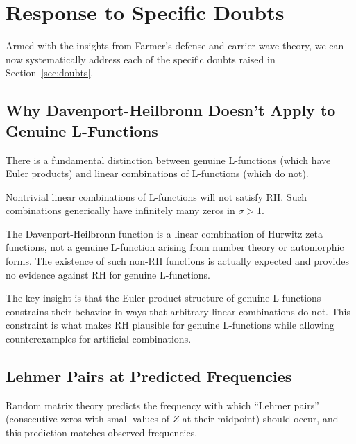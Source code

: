 \section{Response to Specific Doubts}
\label{sec:specific_responses}

Armed with the insights from Farmer's defense and carrier wave theory, we can now systematically address each of the specific doubts raised in Section~\ref{sec:doubts}.

\subsection{Why Davenport-Heilbronn Doesn't Apply to Genuine L-Functions}
\label{subsec:davenport_response}

\begin{theorem}
There is a fundamental distinction between genuine L-functions (which have Euler products) and linear combinations of L-functions (which do not).
\end{theorem}

\begin{principle}
Nontrivial linear combinations of L-functions will not satisfy RH. Such combinations generically have infinitely many zeros in $\sigma > 1$.
\end{principle}

The Davenport-Heilbronn function is a linear combination of Hurwitz zeta functions, not a genuine L-function arising from number theory or automorphic forms. The existence of such non-RH functions is actually expected and provides no evidence against RH for genuine L-functions.

\begin{remark}
The key insight is that the Euler product structure of genuine L-functions constrains their behavior in ways that arbitrary linear combinations do not. This constraint is what makes RH plausible for genuine L-functions while allowing counterexamples for artificial combinations.
\end{remark}

\subsection{Lehmer Pairs at Predicted Frequencies}
\label{subsec:lehmer_response}

\begin{theorem}
Random matrix theory predicts the frequency with which ``Lehmer pairs'' (consecutive zeros with small values of $Z$ at their midpoint) should occur, and this prediction matches observed frequencies.
\end{theorem}


